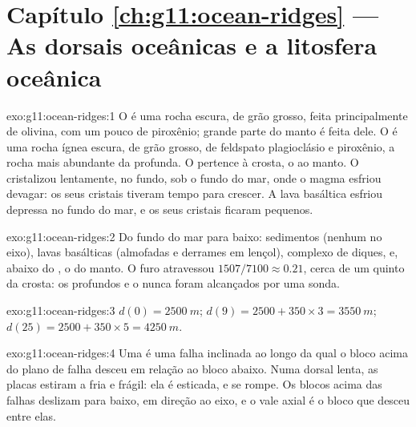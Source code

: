 \section*{Capítulo \ref{ch:g11:ocean-ridges} --- As dorsais oceânicas e a litosfera oceânica}

\begin{solution}{exo:g11:ocean-ridges:1}
O  é uma rocha escura, de grão grosso, feita principalmente de
olivina, com um pouco de piroxênio; grande parte do manto é feita dele. O
 é uma rocha ígnea escura, de grão grosso, de feldspato plagioclásio e
piroxênio, a rocha mais abundante da  profunda. O 
pertence à crosta, o  ao manto. O  cristalizou lentamente, no
fundo, sob o fundo do mar, onde o magma esfriou devagar: os seus cristais
tiveram tempo para crescer. A lava basáltica esfriou depressa no fundo do
mar, e os seus cristais ficaram pequenos.
\end{solution}

\begin{solution}{exo:g11:ocean-ridges:2}
Do fundo do mar para baixo: sedimentos (nenhum no eixo), lavas basálticas
(almofadas e derrames em lençol), complexo de diques,  e, abaixo do
, o  do manto. O furo atravessou $1507/7100 \approx 0.21$,
cerca de um quinto da crosta: os  profundos e o  nunca foram
alcançados por uma sonda.
\end{solution}

\begin{solution}{exo:g11:ocean-ridges:3}
$d(0) = \qty{2500}{m}$; $d(9) = 2500 + 350 \times 3 = \qty{3550}{m}$;
$d(25) = 2500 + 350 \times 5 = \qty{4250}{m}$.
\end{solution}

\begin{solution}{exo:g11:ocean-ridges:4}
Uma  é uma falha inclinada ao longo da qual o bloco acima do
plano de falha desceu em relação ao bloco abaixo. Numa dorsal lenta, as
placas estiram a  fria e frágil: ela é esticada, e se rompe. Os
blocos acima das falhas deslizam para baixo, em direção ao eixo, e o vale
axial é o bloco que desceu entre elas.
\end{solution}

